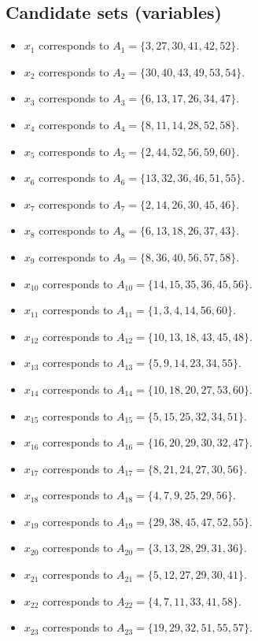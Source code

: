 \documentclass[11pt]{article}
\begin{document}
\subsection*{Candidate sets (variables)}
\begin{itemize}
\item $x_{1}$ corresponds to $A_{1}=\{3, 27, 30, 41, 42, 52\}$.
\item $x_{2}$ corresponds to $A_{2}=\{30, 40, 43, 49, 53, 54\}$.
\item $x_{3}$ corresponds to $A_{3}=\{6, 13, 17, 26, 34, 47\}$.
\item $x_{4}$ corresponds to $A_{4}=\{8, 11, 14, 28, 52, 58\}$.
\item $x_{5}$ corresponds to $A_{5}=\{2, 44, 52, 56, 59, 60\}$.
\item $x_{6}$ corresponds to $A_{6}=\{13, 32, 36, 46, 51, 55\}$.
\item $x_{7}$ corresponds to $A_{7}=\{2, 14, 26, 30, 45, 46\}$.
\item $x_{8}$ corresponds to $A_{8}=\{6, 13, 18, 26, 37, 43\}$.
\item $x_{9}$ corresponds to $A_{9}=\{8, 36, 40, 56, 57, 58\}$.
\item $x_{10}$ corresponds to $A_{10}=\{14, 15, 35, 36, 45, 56\}$.
\item $x_{11}$ corresponds to $A_{11}=\{1, 3, 4, 14, 56, 60\}$.
\item $x_{12}$ corresponds to $A_{12}=\{10, 13, 18, 43, 45, 48\}$.
\item $x_{13}$ corresponds to $A_{13}=\{5, 9, 14, 23, 34, 55\}$.
\item $x_{14}$ corresponds to $A_{14}=\{10, 18, 20, 27, 53, 60\}$.
\item $x_{15}$ corresponds to $A_{15}=\{5, 15, 25, 32, 34, 51\}$.
\item $x_{16}$ corresponds to $A_{16}=\{16, 20, 29, 30, 32, 47\}$.
\item $x_{17}$ corresponds to $A_{17}=\{8, 21, 24, 27, 30, 56\}$.
\item $x_{18}$ corresponds to $A_{18}=\{4, 7, 9, 25, 29, 56\}$.
\item $x_{19}$ corresponds to $A_{19}=\{29, 38, 45, 47, 52, 55\}$.
\item $x_{20}$ corresponds to $A_{20}=\{3, 13, 28, 29, 31, 36\}$.
\item $x_{21}$ corresponds to $A_{21}=\{5, 12, 27, 29, 30, 41\}$.
\item $x_{22}$ corresponds to $A_{22}=\{4, 7, 11, 33, 41, 58\}$.
\item $x_{23}$ corresponds to $A_{23}=\{19, 29, 32, 51, 55, 57\}$.

\end{itemize}
\end{document}
